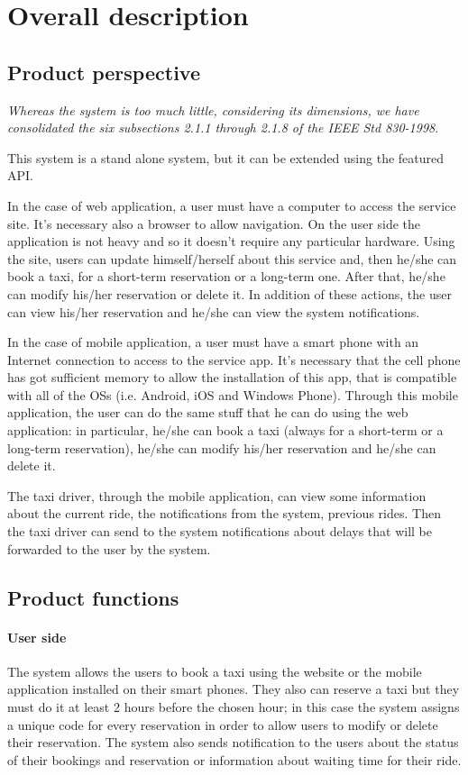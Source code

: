 \section{Overall description}
	\subsection{Product perspective}
		\emph{Whereas the system is too much little, considering its dimensions, we have consolidated the six subsections 2.1.1 through 2.1.8 of the IEEE Std 830-1998}.
		\vspace{10pt}
		
		This system is a stand alone system, but it can be extended using the featured API.
		
		In the case of web application, a user must have a computer to access the service site. It's necessary also a browser to allow navigation. On the user side the application is not heavy and so it doesn't require any particular hardware.
		Using the site, users can update himself/herself about this service and, then he/she can book a taxi, for a short-term reservation or a long-term one. After that, he/she can modify his/her reservation or delete it. In addition of these actions, the user can view his/her reservation and he/she can view the system notifications.
		
		In the case of mobile application, a user must have a smart phone with an Internet connection to access to the service app. It's necessary that the cell phone has got sufficient memory to allow the installation of this app, that is compatible with all of the OSs (i.e. Android, iOS and Windows Phone).
		Through this mobile application, the user can do the same stuff that he can do using the web application: in particular, he/she can book a taxi (always for a short-term or a long-term reservation), he/she can modify his/her reservation and he/she can delete it.
		
		The taxi driver, through the mobile application, can view some information about the current ride, the notifications from the system, previous rides. Then the taxi driver can send to the system notifications about delays that will be forwarded to the user by the system.
	\subsection{Product functions}
		\paragraph{User side}The system allows the users to book a taxi using the website or the mobile application installed on their smart phones. They also can reserve a taxi but they must do it at least 2 hours before the chosen hour; in this case the system assigns a unique code for every reservation in order to allow users to modify or delete their reservation. The system also sends notification to the users about the status of their bookings and reservation or information about waiting time for their ride.
